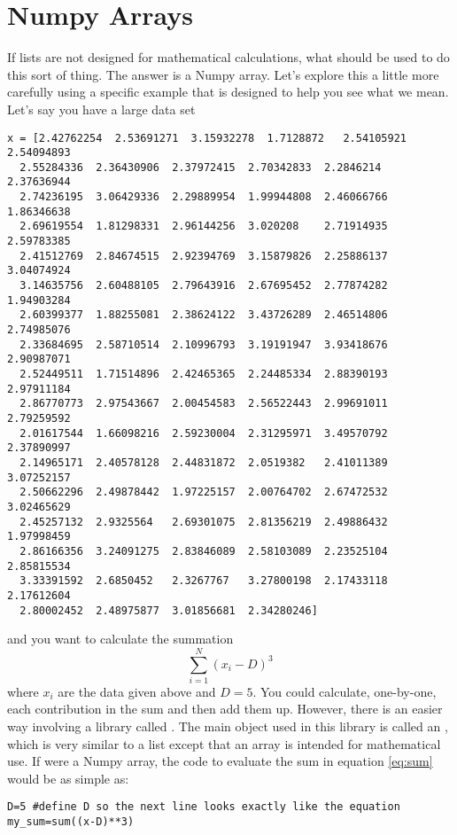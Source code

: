 \section{Numpy Arrays}
If lists are not designed for mathematical calculations, what should
be used to do this sort of thing.  The answer is a Numpy array. Let's
explore this a little more carefully using a specific example that is
designed to help you see what we mean.  Let's say
you have a large data set
\begin{Verbatim}
x = [2.42762254  2.53691271  3.15932278  1.7128872   2.54105921  2.54094893
  2.55284336  2.36430906  2.37972415  2.70342833  2.2846214   2.37636944
  2.74236195  3.06429336  2.29889954  1.99944808  2.46066766  1.86346638
  2.69619554  1.81298331  2.96144256  3.020208    2.71914935  2.59783385
  2.41512769  2.84674515  2.92394769  3.15879826  2.25886137  3.04074924
  3.14635756  2.60488105  2.79643916  2.67695452  2.77874282  1.94903284
  2.60399377  1.88255081  2.38624122  3.43726289  2.46514806  2.74985076
  2.33684695  2.58710514  2.10996793  3.19191947  3.93418676  2.90987071
  2.52449511  1.71514896  2.42465365  2.24485334  2.88390193  2.97911184
  2.86770773  2.97543667  2.00454583  2.56522443  2.99691011  2.79259592
  2.01617544  1.66098216  2.59230004  2.31295971  3.49570792  2.37890997
  2.14965171  2.40578128  2.44831872  2.0519382   2.41011389  3.07252157
  2.50662296  2.49878442  1.97225157  2.00764702  2.67472532  3.02465629
  2.45257132  2.9325564   2.69301075  2.81356219  2.49886432  1.97998459
  2.86166356  3.24091275  2.83846089  2.58103089  2.23525104  2.85815534
  3.33391592  2.6850452   2.3267767   3.27800198  2.17433118  2.17612604
  2.80002452  2.48975877  3.01856681  2.34280246]
\end{Verbatim}
and you want to calculate the summation
\begin{equation}\label{eq:sum}
\sum_{i=1}^N (x_i - D)^3
\end{equation}
where $x_i$ are the data given above and $D = 5$.  You could
calculate, one-by-one, each contribution in the sum and then add them
up.  However, there is an easier way involving
a library called  .  The main object used in this library
is called an , which is very similar to a list except that
an array is intended for mathematical use.  If  were a Numpy
array, the code to evaluate the sum in equation \ref{eq:sum} would be
as simple as:
\begin{Verbatim}
D=5 #define D so the next line looks exactly like the equation
my_sum=sum((x-D)**3)
\end{Verbatim}


